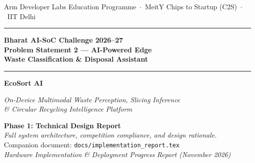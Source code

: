 \documentclass[12pt,a4paper]{article}
\begin{document}
\begin{titlepage}
\centering
\vspace*{0.2cm}

{\normalsize\color{ecosortgray}
  Arm Developer Labs Education Programme\ $\cdot$\ MeitY Chips to Startup (C2S)\ $\cdot$\ IIT Delhi
}

\vspace{0.3cm}
\rule{\linewidth}{1.8pt}
\vspace{0.25cm}

{\LARGE\bfseries\color{ecosortblue}
  Bharat AI-SoC Challenge 2026--27\\[0.3em]
  Problem Statement 2 --- AI-Powered Edge\\[0.15em]
  Waste Classification \& Disposal Assistant
}

\vspace{0.3cm}
\rule{\linewidth}{0.5pt}
\vspace{0.35cm}

{\fontsize{32}{38}\selectfont\bfseries\color{ecosortgreen} EcoSort AI}

\vspace{0.15cm}
{\large\itshape\color{ecosortgray}
  On-Device Multimodal Waste Perception, Slicing Inference\\
  \& Circular Recycling Intelligence Platform
}

\vspace{0.3cm}
\begin{tcolorbox}[enhanced,colback=ecosortblue!8,colframe=ecosortblue,
  fonttitle=\bfseries\small,title={Document Classification},
  top=4pt,bottom=4pt,left=8pt,right=8pt,boxrule=0.8pt,width=12cm]
\centering\small
\textbf{Phase 1: Technical Design Report}\\
\textit{Full system architecture, competition compliance, and design rationale.}\\[2pt]
Companion document: \texttt{docs/implementation\_report.tex}\\
\textit{Hardware Implementation \& Deployment Progress Report (November 2026)}
\end{tcolorbox}

\vspace{0.4cm}


\end{titlepage}
\end{document}
